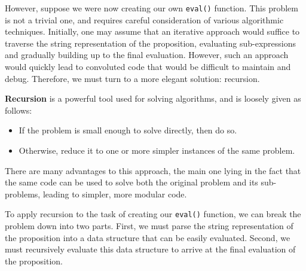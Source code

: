 \documentclass{article}
\begin{document}
    However, suppose we were now creating our own \lstinline+eval()+ function. This problem is not a trivial one, and requires careful consideration of various algorithmic techniques. Initially, one may assume that an iterative approach would suffice to traverse the string representation of the proposition, evaluating sub-expressions and gradually building up to the final evaluation. However, such an approach would quickly lead to convoluted code that would be difficult to maintain and debug. Therefore, we must turn to a more elegant solution: recursion.

    \vspace{2mm}
    \textbf{Recursion} is a powerful tool used for solving algorithms, and is loosely given as follows:
    \begin{itemize}
        \item If the problem is small enough to solve directly, then do so.
        \item Otherwise, reduce it to one or more simpler instances of the same problem.
    \end{itemize}
    There are many advantages to this approach, the main one lying in the fact that the same code can be used to solve both the original problem and its sub-problems, leading to simpler, more modular code.


    \vspace{3mm}
    To apply recursion to the task of creating our \lstinline+eval()+ function, we can break the problem down into two parts. First, we must parse the string representation of the proposition into a data structure that can be easily evaluated. Second, we must recursively evaluate this data structure to arrive at the final evaluation of the proposition.
\end{document}
